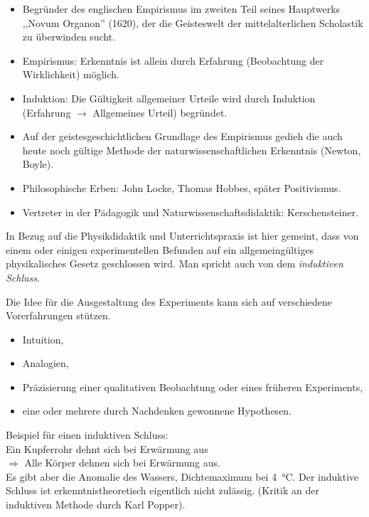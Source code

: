 \begin{itemize}
\item Begr\"{u}nder des englischen Empirismus im zweiten Teil seines
Hauptwerks ,,Novum Organon'' (1620), der die Geisteswelt der
mittelalterlichen Scholastik zu \"{u}berwinden sucht.
\item Empirismus: Erkenntnis ist allein durch Erfahrung
(Beobachtung der Wirklichkeit) m\"{o}glich.
\item Induktion: Die G\"{u}ltigkeit allgemeiner Urteile wird
durch Induktion (Erfahrung $\to$ Allgemeines Urteil)
begr\"{u}ndet.
\item Auf der geistes\-ge\-schicht\-lichen Grundlage
des Empirismus gedieh die auch heute noch g\"{u}ltige Methode der
naturwissenschaftlichen Erkenntnis (Newton, Boyle).
\item Philosophische Erben: John Locke, Thomas Hobbes,
sp\"{a}ter Positivismus.
\item
Vertreter in der P\"{a}dagogik und Naturwissenschafts\-didaktik:
Kerschensteiner.
\end{itemize}

In Bezug auf die Physikdidaktik und Unterrichtspraxis ist hier gemeint,
dass von einem oder einigen experimentellen Befunden auf ein
allgemeing\"{u}ltiges physikalisches Gesetz geschlossen wird.
Man spricht auch von dem \textit{induktiven Schluss}.

Die Idee f\"{u}r die Ausgestaltung des Experiments kann sich auf
verschiedene Vorerfahrungen st\"{u}tzen.

\begin{itemize}
\item Intuition,
\item Analogien,
\item Pr\"{a}zisierung einer qualitativen Beobachtung oder eines
fr\"{u}heren Experiments,
\item eine oder mehrere durch Nachdenken gewonnene Hypothesen.
\end{itemize}

\bip Beispiel f\"{u}r einen induktiven Schluss: \\[2ex]
Ein Kupferrohr dehnt sich bei Erw\"{a}rmung aus \\
$\Rightarrow$ \q Alle K\"{o}rper dehnen sich bei Erw\"{a}rmung aus. \\
\mip
Es gibt aber die Anomalie des Wassers, Dichtemaximum bei \SI{4}{\celsius}.
\bip
Der induktive Schluss ist erkenntnistheoretisch eigentlich
nicht zul\"{a}ssig. (Kritik an der induktiven Methode durch Karl Popper).

